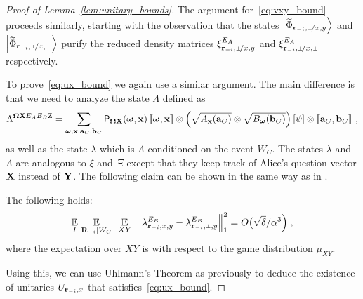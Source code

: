 \begin{proof}[Proof of Lemma~\ref{lem:unitary_bounds}]
The argument for~\eqref{eq:vxy_bound} proceeds similarly, starting with the observation that the states $\bigket{\wt{\Phi}_\sspxy}$ and $\bigket{\wt{\Phi}_\sspxp}$ purify the reduced density matrices $\xi^{E_A}_\sspxy$ and $\xi^{E_A}_\sspxp$ respectively. 

To prove~\eqref{eq:ux_bound} we again use a similar argument. The main difference is that  we need to analyze the state $\Lambda$ defined as
\[
\Lambda^{{\boldsymbol{\Omega}} \mathbf{X} E_AE_B\mathrm{Z}} = \sum_{{\boldsymbol{\omega}}, \mathbf{x}, \mathbf{a}_C, \mathbf{b}_C} \mathsf{P}_{{\boldsymbol{\Omega}} \mathbf{X}} ({\boldsymbol{\omega}}, \mathbf{x}) \, \llbracket {\boldsymbol{\omega}}, \mathbf{x} \rrbracket   \otimes \left (\sqrt{A_{\mathbf{x}}(\mathbf{a}_C)} \otimes \sqrt{B_{{\boldsymbol{\omega}}}(\mathbf{b}_C)} \right ) \left [\psi \right ] \otimes \llbracket \mathbf{a}_C, \mathbf{b}_C \rrbracket~,
\]
as well as the state $\lambda$ which is $\Lambda$ conditioned on the event $W_C$. The states $\lambda$ and $\Lambda$ are analogous to $\xi$ and $\Xi$ except that they keep track of Alice's question vector $\mathbf{X}$ instead of $\mathbf{Y}$. The following claim can be shown in the same way as in . 

\begin{claim}\label{claim:yi-change-x}
The following holds:
\begin{align}
\label{eq:E_B_1}
\Ex_I \, \Ex_{\bR_\mi |  W_C} \, \, \, \Ex_{XY} \,\, \Big \| \lambda^{E_B}_\ssxy - \lambda^{E_B}_\sspy \Big \|_1^2 = O\big(\sqrt{\delta}/\alpha^3 \Big)\;,
\end{align}
where the expectation over $XY$ is with respect to the game distribution $\mu_{XY}$. 
\end{claim}

Using this, we can use Uhlmann's Theorem as previously to deduce the existence of unitaries $U_{\mathbf{r}_{-i},x}$ that satisfies~\eqref{eq:ux_bound}. 
\end{proof}




